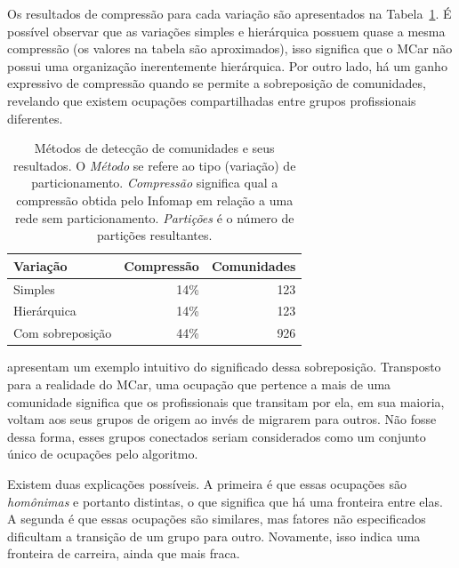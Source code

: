 \documentclass[
  article,
  11pt,
  a4paper,
  english,
  brazil,
  sumario=tradicional]{abntex2}
\begin{document}
Os resultados de compressão para cada variação são apresentados na Tabela~\ref{tab:metodos}. É possível observar que as variações simples e hierárquica possuem quase a mesma compressão (os valores na tabela são aproximados), isso significa que o MCar não possui uma organização inerentemente hierárquica. Por outro lado, há um ganho expressivo de compressão quando se permite a sobreposição de comunidades, revelando que existem ocupações compartilhadas entre grupos profissionais diferentes.


\begin{table}
  \centering
  \begin{tabular}{@{} l r r @{}}
    \toprule
    Variação         & Compressão & Comunidades  \\
    \midrule
    Simples          & 14\%       & 123     \\
    Hierárquica      & 14\%       & 123     \\
    Com sobreposição & 44\%       & 926     \\
    \bottomrule
  \end{tabular}
  \caption{Métodos de detecção de comunidades e seus resultados. O \textit{Método} se refere ao tipo (variação) de particionamento. \textit{Compressão} significa qual a compressão obtida pelo Infomap em relação a uma rede sem particionamento. \textit{Partições} é o número de partições resultantes.}
  \label{tab:metodos}
\end{table}

 apresentam um exemplo intuitivo do significado dessa sobreposição. Transposto para a realidade do MCar, uma ocupação que pertence a mais de uma comunidade significa que os profissionais que transitam por ela, em sua maioria, voltam aos seus grupos de origem ao invés de migrarem para outros. Não fosse dessa forma, esses grupos conectados seriam considerados como um conjunto único de ocupações pelo algoritmo.

Existem duas explicações possíveis. A primeira é que essas ocupações são \textit{homônimas} e portanto distintas, o que significa que há uma fronteira entre elas. A segunda é que essas ocupações são similares, mas fatores não especificados dificultam a transição de um grupo para outro. Novamente, isso indica uma fronteira de carreira, ainda que mais fraca.
\end{document}
